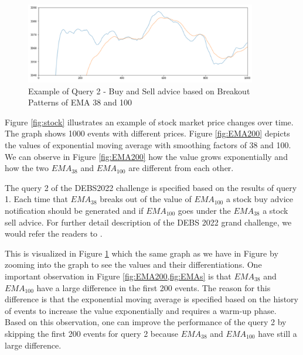 \begin{figure}[!ht]
    \begin{center}
        \includegraphics[width=0.90\textwidth]{./images/query2_example.png}
        \caption{Example of Query 2 - Buy and Sell advice based on Breakout Patterns of EMA 38 and 100 }
        \label{fig:EMAs}
    \end{center}
\end{figure}




Figure \ref{fig:stock} illustrates an example of stock market price changes over time. The graph shows 1000 events with 
different prices. Figure \ref{fig:EMA200} depicts the values of exponential moving average with 
smoothing factors of 38 and 100. We can observe in Figure \ref{fig:EMA200} how the value grows exponentially 
and how the two $EMA_{38}$ and $EMA_{100}$ are different from each other. 

The query 2 of the DEBS2022 challenge \cite{debs2022challenge} is specified based on the results of query 1. Each time 
that $EMA_{38}$ breaks out of the value of $EMA_{100}$ a stock buy advice notification should be generated and if
$EMA_{100}$ goes under the $EMA_{38}$ a stock sell advice. For further detail description of the DEBS 2022 
grand challenge, we would refer the readers to \cite{debs2022challenge}. 

This is visualized in Figure \ref{fig:EMAs} which the same graph as we have in Figure \label{fig:EMAs} by 
zooming into the graph to see the values and their differentiations. One important observation in 
Figure \ref{fig:EMA200,fig:EMAs} is that $EMA_{38}$ and $EMA_{100}$ have a large difference in the first 
200 events.  The reason for this difference is that the exponential moving average is specified based 
on the history of events to increase the value exponentially and requires a warm-up phase. Based on this observation,
one can improve the performance of the query 2 by skipping the first 200 events for query 2 because 
$EMA_{38}$ and $EMA_{100}$ have still a large difference. 




